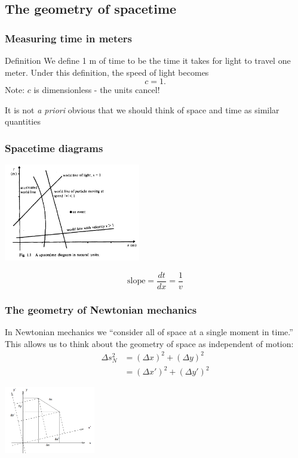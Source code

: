 \documentclass{beamer}
\begin{document}
\subsection{The geometry of spacetime}

\begin{frame}
    \frametitle{Measuring time in meters}
    \begin{block}{Definition}
        We define 1 m of time to be the time it takes for light to travel one meter.
        Under this definition, the speed of light becomes
        \[c=1.\]
        Note: $c$ is dimensionless - the units cancel!
    \end{block}
    \vspace{2mm}
    It is not \textit{a priori} obvious that we should think of space and time as similar quantities
\end{frame}

\begin{frame}
    \frametitle{Spacetime diagrams}
    \begin{center}
        \includegraphics[width=225px]{img/diagram1.png}
    \end{center}
    \[\text{slope}=\frac{dt}{dx}=\frac{1}{v}\]
\end{frame}

\begin{frame}
    \frametitle{The geometry of Newtonian mechanics}
    In Newtonian mechanics we ``consider all of space at a single moment in time.''
    This allows us to think about the geometry of space as independent of motion:
    \begin{align*}
        \Delta s_N^2&=(\Delta x)^2+(\Delta y)^2\\
        &=(\Delta x')^2+(\Delta y')^2
    \end{align*}
    \begin{center}
        \includegraphics[width=150px]{img/coordchange.png}
    \end{center}
\end{frame}
\end{document}
